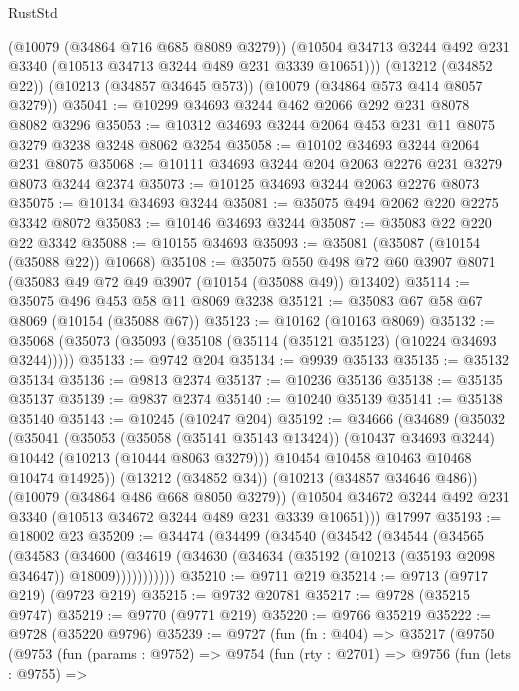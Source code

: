 \begin{lexlean}{RustStd}
\begin{coremodule}
      (@10079 (@34864 @716 @685 @8089 @3279))
      (@10504 @34713 @3244 @492 @231 @3340 (@10513 @34713 @3244 @489 @231 @3339 @10651)))
    (@13212 (@34852 @22))
    (@10213 (@34857 @34645 @573))
    (@10079 (@34864 @573 @414 @8057 @3279))
@35041 := @10299 @34693 @3244 @462 @2066 @292 @231 @8078 @8082 @3296
@35053 := @10312 @34693 @3244 @2064 @453 @231 @11 @8075 @3279 @3238 @3248 @8062 @3254
@35058 := @10102 @34693 @3244 @2064 @231 @8075
@35068 := @10111 @34693 @3244 @204 @2063 @2276 @231 @3279 @8073 @3244 @2374
@35073 := @10125 @34693 @3244 @2063 @2276 @8073
@35075 := @10134 @34693 @3244
@35081 := @35075 @494 @2062 @220 @2275 @3342 @8072
@35083 := @10146 @34693 @3244
@35087 := @35083 @22 @220 @22 @3342
@35088 := @10155 @34693
@35093 := @35081 (@35087 (@10154 (@35088 @22)) @10668)
@35108 := @35075
    @550
    @498
    @72
    @60
    @3907
    @8071
    (@35083 @49 @72 @49 @3907 (@10154 (@35088 @49)) @13402)
@35114 := @35075 @496 @453 @58 @11 @8069 @3238
@35121 := @35083 @67 @58 @67 @8069 (@10154 (@35088 @67))
@35123 := @10162 (@10163 @8069)
@35132 := @35068 (@35073 (@35093 (@35108 (@35114 (@35121 @35123) (@10224 @34693 @3244)))))
@35133 := @9742 @204
@35134 := @9939 @35133
@35135 := @35132 @35134
@35136 := @9813 @2374
@35137 := @10236 @35136
@35138 := @35135 @35137
@35139 := @9837 @2374
@35140 := @10240 @35139
@35141 := @35138 @35140
@35143 := @10245 (@10247 @204)
@35192 := @34666
    (@34689
      (@35032
        (@35041
          (@35053
            (@35058 (@35141 @35143 @13424))
            (@10437 @34693 @3244)
            @10442
            (@10213 (@10444 @8063 @3279)))
          @10454
          @10458
          @10463
          @10468
          @10474
          @14925))
      (@13212 (@34852 @34))
      (@10213 (@34857 @34646 @486))
      (@10079 (@34864 @486 @668 @8050 @3279))
      (@10504 @34672 @3244 @492 @231 @3340 (@10513 @34672 @3244 @489 @231 @3339 @10651)))
    @17997
@35193 := @18002 @23
@35209 := @34474
    (@34499
      (@34540
        (@34542
          (@34544
            (@34565
              (@34583
                (@34600
                  (@34619 (@34630 (@34634 (@35192 (@10213 (@35193 @2098 @34647)) @18009)))))))))))
@35210 := @9711 @219
@35214 := @9713 (@9717 @219) (@9723 @219)
@35215 := @9732 @20781
@35217 := @9728 (@35215 @9747)
@35219 := @9770 (@9771 @219)
@35220 := @9766 @35219
@35222 := @9728 (@35220 @9796)
@35239 := @9727
    (fun (fn : @404) =>
    @35217
      (@9750
        (@9753
          (fun (params : @9752) =>
          @9754
            (fun (rty : @2701) =>
            @9756
              (fun (lets : @9755) =>

\end{coremodule}
\end{lexlean}
